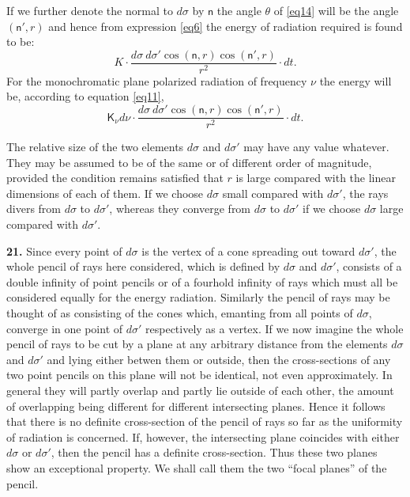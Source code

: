 \documentclass[12pt,oneside]{book}
\begin{document}
If we further denote the normal to $d\sigma$ by $\mathsf{n}$ the angle $\theta$ of \eqref{eq14} will be the angle $(\mathsf{n}',r)$ and hence from expression \eqref{eq6} the energy of radiation required is found to be:
\begin{equation}
    K\cdot\frac{d\sigma\ d\sigma' \cos(\mathsf{n},r)\cos(\mathsf{n}',r)}{r^2}\cdot dt.
    \label{eq17}
\end{equation}
For the monochromatic plane polarized radiation of frequency $\nu$ the energy will be, according to equation \eqref{eq11},
\begin{equation}
    \mathsf{K}_\nu d\nu\cdot\frac{d\sigma\ d\sigma' \cos(\mathsf{n},r)\cos(\mathsf{n}',r)}{r^2}\cdot dt.
    \label{eq18}
\end{equation} \par
The relative size of the two elements $d\sigma$ and $d\sigma'$ may have any value whatever. They may be assumed to be of the same or of different order of magnitude, provided the condition remains satisfied that $r$ is large compared with the linear dimensions of each of them. If we choose $d\sigma$ small compared with $d\sigma'$, the rays divers from $d\sigma$ to $d\sigma'$, whereas they converge from $d\sigma$ to $d\sigma'$ if we choose $d\sigma$ large compared with $d\sigma'$. \par

\textbf{21.} Since every point of $d\sigma$ is the vertex of a cone spreading out toward $d\sigma'$, the whole pencil of rays here considered, which is defined by $d\sigma$ and $d\sigma'$, consists of a double infinity of point pencils or of a fourhold infinity of rays which must all be considered equally for the energy radiation. Similarly the pencil of rays may be thought of as consisting of the cones which, emanting from all points of $d\sigma$, converge in one point of $d\sigma'$ respectively as a vertex. If we now imagine the whole pencil of rays to be cut by a plane at any arbitrary distance from the elements $d\sigma$ and $d\sigma'$ and lying either betwen them or outside, then the cross-sections of any two point pencils on this plane will not be identical, not even approximately. In general they will partly overlap and partly lie outside of each other, the amount of overlapping being different for different intersecting planes. Hence it follows that there is no definite cross-section of the pencil of rays so far as the uniformity of radiation is concerned. If, however, the intersecting plane coincides with either $d\sigma$ or $d\sigma'$, then the pencil has a definite cross-section. Thus these two planes show an exceptional property. We shall call them the two ``focal planes'' of the pencil. \par
\end{document}
